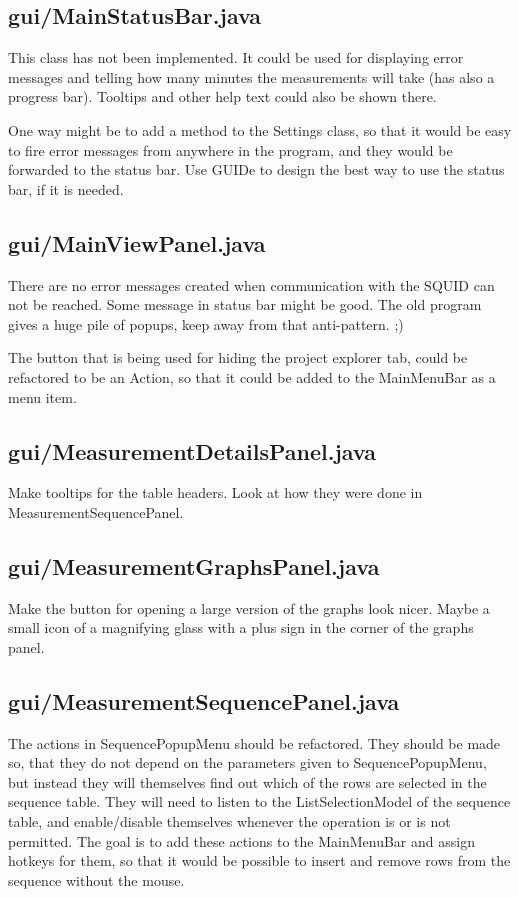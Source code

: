 \subsection{gui/MainStatusBar.java}

This class has not been implemented. It could be used for displaying error messages and telling how many minutes the measurements will take (has also a progress bar). Tooltips and other help text could also be shown there.

One way might be to add a method to the Settings class, so that it would be easy to fire error messages from anywhere in the program, and they would be forwarded to the status bar. Use GUIDe to design the best way to use the status bar, if it is needed.


\subsection{gui/MainViewPanel.java}

There are no error messages created when communication with the SQUID can not be reached. Some message in status bar might be good. The old program gives a huge pile of popups, keep away from that anti-pattern. ;)

The button that is being used for hiding the project explorer tab, could be refactored to be an Action, so that it could be added to the MainMenuBar as a menu item.


\subsection{gui/MeasurementDetailsPanel.java}

Make tooltips for the table headers. Look at how they were done in MeasurementSequencePanel.


\subsection{gui/MeasurementGraphsPanel.java}

Make the button for opening a large version of the graphs look nicer. Maybe a small icon of a magnifying glass with a plus sign in the corner of the graphs panel.


\subsection{gui/MeasurementSequencePanel.java}

The actions in SequencePopupMenu should be refactored. They should be made so, that they do not depend on the parameters given to SequencePopupMenu, but instead they will themselves find out which of the rows are selected in the sequence table. They will need to listen to the ListSelectionModel of the sequence table, and enable/disable themselves whenever the operation is or is not permitted. The goal is to add these actions to the MainMenuBar and assign hotkeys for them, so that it would be possible to insert and remove rows from the sequence without the mouse.


